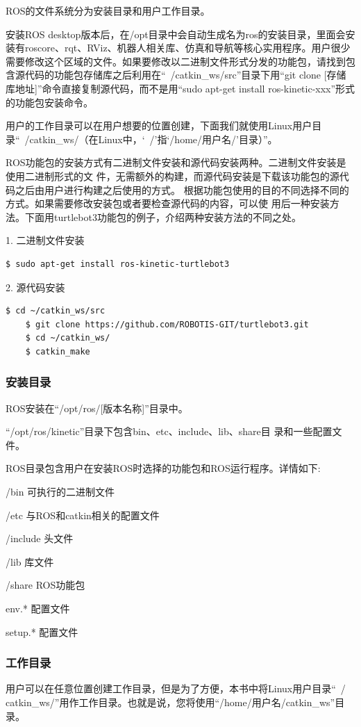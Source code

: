 \documentclass[geye,green,kindle,cn]{elegantnote}
\begin{document}
ROS的文件系统分为安装目录和用户工作目录。

安装ROS desktop版本后，在/opt目录中会自动生成名为ros的安装目录，里面会安装有roscore、rqt、RViz、机器人相关库、仿真和导航等核心实用程序。用户很少需要修改这个区域的文件。如果要修改以二进制文件形式分发的功能包，请找到包含源代码的功能包存储库之后利用在“~/catkin\_ws/src”目录下用“git clone [存储库地址]”命令直接复制源代码，而不是用“sudo apt-get install ros-kinetic-xxx”形式的功能包安装命令。

用户的工作目录可以在用户想要的位置创建，下面我们就使用Linux用户目录“~/catkin\_ws/（在Linux中，‘~/’指‘/home/用户名/’目录）”。

ROS功能包的安装方式有二进制文件安装和源代码安装两种。二进制文件安装是使用二进制形式的文 件，无需额外的构建，而源代码安装是下载该功能包的源代码之后由用户进行构建之后使用的方式。 根据功能包使用的目的不同选择不同的方式。如果需要修改安装包或者要检查源代码的内容，可以使 用后一种安装方法。下面用turtlebot3功能包的例子，介绍两种安装方法的不同之处。

1. 二进制文件安装
\begin{lstlisting}[frame=single,language=bash]
    $ sudo apt-get install ros-kinetic-turtlebot3
\end{lstlisting}

2. 源代码安装
\begin{lstlisting}[frame=single,language=bash]
    $ cd ~/catkin_ws/src
    $ git clone https://github.com/ROBOTIS-GIT/turtlebot3.git
    $ cd ~/catkin_ws/
    $ catkin_make
\end{lstlisting}
\subsubsection{安装目录}
ROS安装在“/opt/ros/[版本名称]”目录中。

“/opt/ros/kinetic”目录下包含bin、etc、include、lib、share目 录和一些配置文件。

ROS目录包含用户在安装ROS时选择的功能包和ROS运行程序。详情如下:

/bin  可执行的二进制文件

/etc   与ROS和catkin相关的配置文件

/include  头文件

/lib   库文件

/share  ROS功能包

env.*  配置文件

setup.*  配置文件
\subsubsection{工作目录}
用户可以在任意位置创建工作目录，但是为了方便，本书中将Linux用户目录“~/ catkin\_ws/”用作工作目录。也就是说，您将使用“/home/用户名/catkin\_ws”目录。
\end{document}
